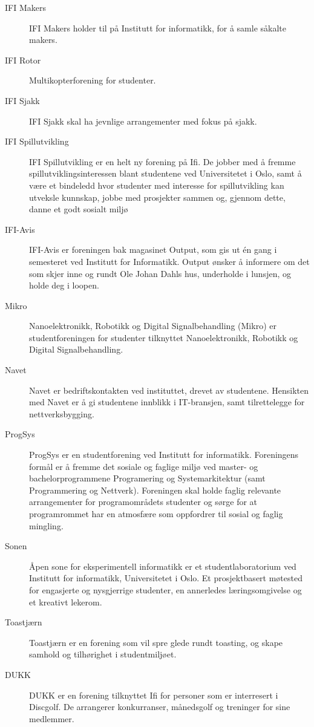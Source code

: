 \begin{description}
	\item[IFI Makers] IFI Makers holder til på Institutt for informatikk, for å samle såkalte makers.
	\item[IFI Rotor] Multikopterforening for studenter.
	\item[IFI Sjakk] IFI Sjakk skal ha jevnlige arrangementer med fokus på sjakk.
	\item[IFI Spillutvikling] IFI Spillutvikling er en helt ny forening på Ifi. De jobber med å fremme spillutviklingsinteressen blant studentene ved Universitetet i Oslo, samt å være et bindeledd hvor studenter med interesse for spillutvikling kan utveksle kunnskap, jobbe med prosjekter sammen og, gjennom dette, danne et godt sosialt miljø
	\item[IFI-Avis] IFI-Avis er foreningen bak magasinet Output, som gis ut én gang i semesteret ved Institutt for Informatikk. Output ønsker å informere om det som skjer inne og rundt Ole Johan Dahls hus, underholde i lunsjen, og holde deg i loopen.
	\item[Mikro] Nanoelektronikk, Robotikk og Digital Signalbehandling (Mikro) er studentforeningen for studenter tilknyttet Nanoelektronikk, Robotikk og Digital Signalbehandling.
	\item[Navet] Navet er bedriftskontakten ved instituttet, drevet av studentene. Hensikten med Navet er å gi studentene innblikk i IT-bransjen, samt tilrettelegge for nettverksbygging.
	\item[ProgSys] ProgSys er en studentforening ved Institutt for informatikk. Foreningens formål er å fremme det sosiale og faglige miljø ved master- og bachelorprogrammene Programering og Systemarkitektur (samt Programmering og Nettverk). Foreningen skal holde faglig relevante arrangementer for programområdets studenter og sørge for at programrommet har en atmosfære som oppfordrer til sosial og faglig mingling.
	\item[Sonen] Åpen sone for eksperimentell informatikk er et studentlaboratorium ved Institutt for informatikk, Universitetet i Oslo. Et prosjektbasert møtested for engasjerte og nysgjerrige studenter, en annerledes læringsomgivelse og et kreativt lekerom.
	\item[Toastjærn] Toastjærn er en forening som vil spre glede rundt toasting, og skape samhold og tilhørighet i studentmiljøet.
	\item[DUKK] DUKK er en forening tilknyttet Ifi for personer som er interresert i Discgolf. De arrangerer konkurranser, månedsgolf og treninger for sine medlemmer.
\end{description}

